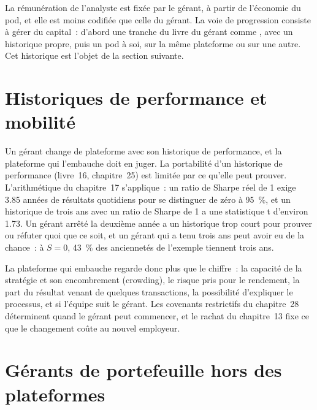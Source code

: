La rémunération de l'analyste est fixée par le gérant, à partir de l'économie du pod, et elle est moins codifiée que celle du gérant. La
voie de progression consiste à gérer du capital~: d'abord une tranche du livre du gérant comme , avec un historique propre, puis un
pod à soi, sur la même plateforme ou sur une autre. Cet historique est l'objet de la section suivante.

\section{Historiques de performance et mobilité}

Un gérant change de plateforme avec son historique de performance, et la plateforme qui l'embauche doit en juger. La portabilité d'un historique de performance
(livre~16, chapitre~25) est limitée par ce qu'elle peut prouver. L'arithmétique du chapitre~17 s'applique~: un ratio de Sharpe réel de 1 exige
3.85 années de résultats quotidiens pour se distinguer de zéro à 95~\%, et un historique de trois ans avec un ratio de Sharpe de 1 a une
statistique t d'environ 1.73. Un gérant arrêté la deuxième année a un historique trop court pour prouver ou réfuter quoi que ce soit, et un
gérant qui a tenu trois ans peut avoir eu de la chance~: à $S=0$, 43~\% des anciennetés de l'exemple tiennent trois ans.

La plateforme qui embauche regarde donc plus que le chiffre~: la capacité de la stratégie et son encombrement (crowding), le risque pris pour le
rendement, la part du résultat venant de quelques transactions, la possibilité d'expliquer le processus, et si l'équipe suit
le gérant. Les covenants restrictifs du chapitre~28 déterminent quand le gérant peut commencer, et le rachat du chapitre~13
fixe ce que le changement coûte au nouvel employeur.

\section{Gérants de portefeuille hors des plateformes}


